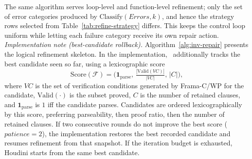 \DIFaddbegin
The same algorithm serves loop-level and function-level refinement; only the set of error categories produced by $\mathrm{Classify}(\mathit{Errors},k)$, and hence the strategy rows selected from Table~\ref{tab:refine-strategy} differs. This keeps the control loop uniform while letting each failure category receive its own repair action.
\noindent\textit{Implementation note (best-candidate rollback).}
Algorithm~\ref{alg:inv-repair} presents the logical refinement skeleton. In the implementation, \toolname\ additionally tracks the best candidate seen so far, using a lexicographic score
\[
\mathrm{Score}(\mathcal{F}) =
\big(\mathbf{1}_{\mathrm{parse}},\,
\tfrac{|\mathrm{Valid}(\mathit{VC})|}{|\mathit{VC}|},\,
|C|\big),
\]
where $\mathit{VC}$ is the set of verification conditions generated by Frama-C/WP for the candidate, $\mathrm{Valid}(\cdot)$ is the subset proved, $C$ is the number of retained clauses, and $\mathbf{1}_{\mathrm{parse}}$ is $1$ iff the candidate parses. Candidates are ordered lexicographically by this score, preferring parseability, then proof ratio, then the number of retained clauses. If two consecutive rounds do not improve the best score (\(\textit{patience}=2\)), the implementation restores the best recorded candidate and resumes refinement from that snapshot. If the iteration budget is exhausted, Houdini starts from the same best candidate.
\DIFaddend

